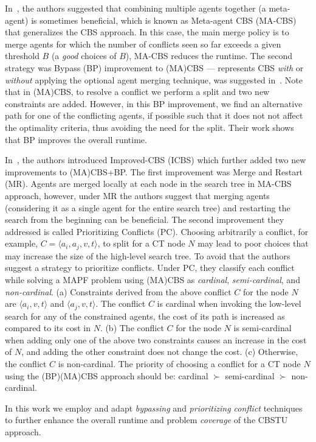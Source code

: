 
In~\cite{sharon2015conflict}, 
the authors suggested that combining multiple agents together (a meta-agent) is sometimes beneficial, which is known as Meta-agent CBS (MA-CBS) that generalizes the CBS approach.
In this case, the main merge policy is to merge agents for which the number of conflicts seen so far exceeds a given  threshold $B$ (a \emph{good} choices of $B$), MA-CBS reduces  the runtime. 
The second strategy was Bypass (BP) improvement to (MA)CBS --- represents CBS \emph{with} or \emph{without} applying the optional agent merging technique, was  suggested in~\cite{BoyraskyFSS15}. 
Note that in (MA)CBS, to resolve a conflict we perform a split and two new constraints are added. However, in this BP improvement, we find an alternative path for one of the conflicting agents, if possible such that it does not not affect the optimality criteria, thus avoiding the need for the split. 
Their work shows that BP improves the overall runtime.

In~\cite{BoyarskiFSSTBS15}, the authors introduced Improved-CBS (ICBS) which further added two new improvements to (MA)CBS+BP.
The first improvement was Merge and Restart (MR). Agents are merged locally at each node in the search tree in MA-CBS approach, however, under MR the authors suggest that merging agents (considering it as a single agent for the entire search tree) and restarting the search from the beginning can be beneficial. 
%
The second improvement they addressed is called Prioritizing Conflicts (PC).
Choosing arbitrarily a conflict, for example, $C=\langle a_i,a_j,v,t\rangle$, to split for a CT node $N$ may lead to poor choices that may increase the size of the high-level search tree. To avoid that the authors suggest a strategy to prioritize conflicts.
Under PC, they classify each conflict while solving a MAPF problem using (MA)CBS as \emph{cardinal}, \emph{semi-cardinal}, and \emph{non-cardinal}.
(a) Constraints derived from the above conflict $C$ for the node $N$ are $\langle a_i,v,t\rangle$ and $\langle a_j,v,t\rangle$.
The conflict $C$ is cardinal when invoking the low-level search for any of the constrained agents, the cost of its path is increased as compared to its cost in $N$. 
(b) The conflict $C$ for the node $N$ is semi-cardinal when adding only one of the above two constraints causes an increase in the cost of $N$, and adding the other constraint does not change the cost. 
(c) Otherwise, the conflict $C$ is non-cardinal. 
The priority of choosing a conflict for a CT node $N$ using the (BP)(MA)CBS approach should be: cardinal $\succ$ semi-cardinal $\succ$ non-cardinal.  

In this work we employ and adapt \emph{bypassing} and \emph{prioritizing conflict} techniques to further enhance the overall runtime and problem \emph{coverage} of the CBSTU approach. 